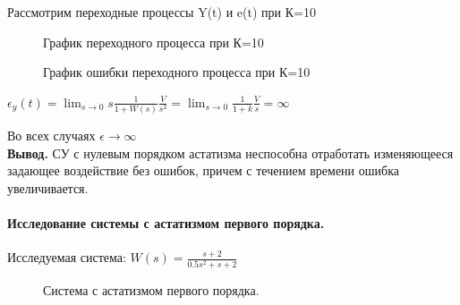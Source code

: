 \documentclass[a4paper, 11pt]{article}
\begin{document}
Рассмотрим переходные процессы Y(t) и e(t) при К=10

\begin{figure}[h!]
    \caption{График переходного процесса при К=10}
    \label{four}
\end{figure}

\newpage

\begin{figure}[h!]
    \caption{График ошибки переходного процесса при К=10}
    \label{tree}
\end{figure}

$\epsilon_y(t)=\lim_{s\to0}s\frac{1}{1+W(s)}\frac{V}{s^2}=\lim_{s\to0}\frac{1}{1+k}\frac{V}{s}=\infty$

Во всех случаях $\epsilon\to\infty$ \\

\textbf{Вывод.} СУ с нулевым порядком астатизма неспособна отработать изменяющееся задающее воздействие без ошибок, причем с течением времени ошибка увеличивается.
\newpage
\paragraph{Исследование системы с астатизмом первого порядка.}

Исследуемая система: \large{$W(s)=\frac{s+2}{0.5s^2+s+2}$}


\begin{figure}[h!]
    \caption{Система с астатизмом первого порядка.}
    \label{one}
\end{figure}
\end{document}
